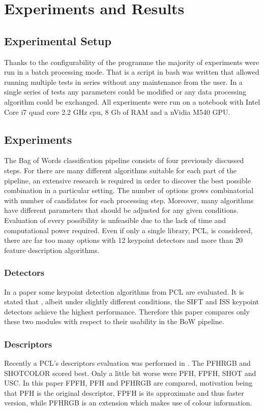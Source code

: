\chapter{Experiments and Results}

\section{Experimental Setup}
	Thanks to the configurability of the programme the majority of experiments were run in a batch processing mode. That is a script in bash was written that allowed running multiple tests in series without any maintenance from the user. In a single series of tests any parameters could be modified or any data processing algorithm could be exchanged. All experiments were run on a notebook with Intel Core i7 quad core 2.2 GHz cpu, 8 Gb of RAM and a nVidia M540 GPU.

\section{Experiments}
	The Bag of Words classification pipeline consists of four previously discussed steps. For there are many different algorithms suitable for each part of the pipeline, an extensive research is required in order to discover the best possible combination in a particular setting. The number of options grows combinatorial with number of candidates for each processing step. Moreover, many algorithms have different parameters that should be adjusted for any given conditions. Evaluation of every possibility is unfeasible due to the lack of time and computational power required. Even if only a single library, PCL, is considered, there are far too many options with 12 keypoint detectors and more than 20 feature description algorithms. 
	
	\subsection{Detectors}
	In a paper \cite{pcl_keypoint_comparision} some keypoint detection algorithms from PCL are evaluated. It is stated that , albeit under slightly different conditions, the SIFT and ISS keypoint detectors achieve the highest performance. Therefore this paper compares only these two modules with respect to their usability in the BoW pipeline. 

	\subsection{Descriptors}
	Recently a PCL's descriptors evaluation was performed in \cite{pcl_features}. The PFHRGB and SHOTCOLOR scored best. Only a little bit worse were PFH, FPFH, SHOT and USC. In this paper FPFH, PFH and PFHRGB are compared, motivation being that PFH is the original descriptor, FPFH is its approximate and thus faster version, while PFHRGB is an extension which makes use of colour information.
	
